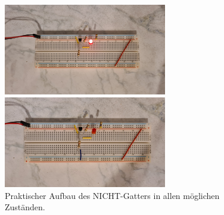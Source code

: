 \begin{figure}[h!]
	\begin{minipage}{.5\textwidth}
		\centering
		\includegraphics[height=4cm, keepaspectratio]{./Fotos/NICHT-0.jpg}
	\end{minipage}%
	\begin{minipage}{.5\textwidth}
		\centering
		\includegraphics[height=4cm, keepaspectratio]{./Fotos/NICHT-1.jpg}
	\end{minipage}
	\caption{Praktischer Aufbau des NICHT-Gatters in allen möglichen Zuständen.}
\end{figure}
\newpage

